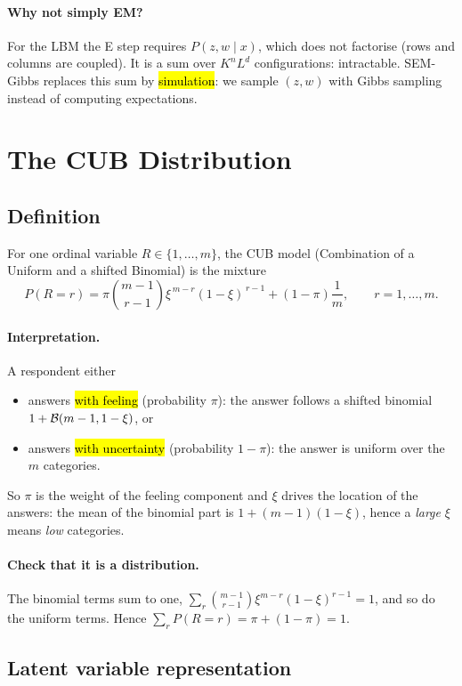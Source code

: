 \paragraph{Why not simply EM?}
For the LBM the E step requires
$P(z,w\mid x)$, which does not factorise (rows and columns are
coupled). It is a sum over $K^nL^d$ configurations: intractable.
SEM-Gibbs replaces this sum by \hl{simulation}: we sample $(z,w)$ with
Gibbs sampling instead of computing expectations.

\section{The CUB Distribution}

\subsection{Definition}

For one ordinal variable $R\in\{1,\ldots,m\}$, the CUB model
(Combination of a Uniform and a shifted Binomial) is the mixture
\[
\boxed{
P(R=r)
=
\pi\binom{m-1}{r-1}\xi^{\,m-r}(1-\xi)^{\,r-1}
+(1-\pi)\frac1m,
\qquad r=1,\ldots,m.
}
\]

\paragraph{Interpretation.}
A respondent either
\begin{itemize}
  \item answers \hl{with feeling} (probability $\pi$): the answer follows a
  shifted binomial $1+\mathcal{B}(m-1,1-\xi)$, or
  \item answers \hl{with uncertainty} (probability $1-\pi$): the answer is
  uniform over the $m$ categories.
\end{itemize}
So $\pi$ is the weight of the feeling component and $\xi$ drives the
location of the answers: the mean of the binomial part is
$1+(m-1)(1-\xi)$, hence a \emph{large} $\xi$ means \emph{low} categories.

\paragraph{Check that it is a distribution.}
The binomial terms sum to one, $\sum_r\binom{m-1}{r-1}\xi^{m-r}(1-\xi)^{r-1}=1$,
and so do the uniform terms. Hence
$\sum_rP(R=r)=\pi+(1-\pi)=1$.

\subsection{Latent variable representation}

